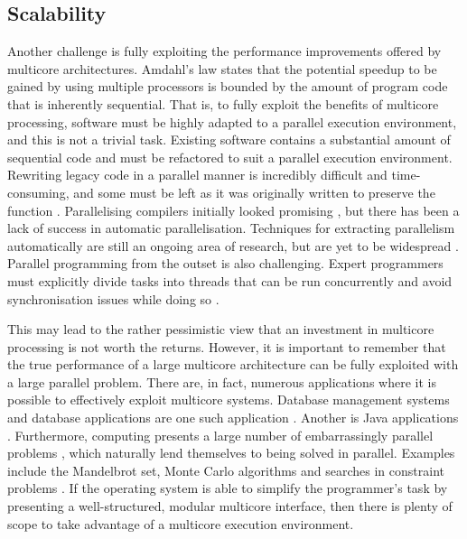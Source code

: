 \documentclass[bsc,frontabs,singlespacing,parskip,deptreport]{infthesis}
\begin{document}
\subsection{Scalability} \label{scalability-challenges}
Another challenge is fully exploiting the performance improvements offered by multicore architectures. Amdahl’s law \cite{DBLP:conf/afips/Amdahl67, DBLP:journals/computer/Amdahl13} states that the potential speedup to be gained by using multiple processors is bounded by the amount of program code that is inherently sequential. That is, to fully exploit the benefits of multicore processing, software must be highly adapted to a parallel execution environment, and this is not a trivial task. Existing software contains a substantial amount of sequential code and must be refactored to suit a parallel execution environment. Rewriting legacy code in a parallel manner is incredibly difficult and time-consuming, and some must be left as it was originally written to preserve the function \cite{geer}. Parallelising compilers initially looked promising \cite{lamport}, but there has been a lack of success in automatic parallelisation. Techniques for extracting parallelism automatically are still an ongoing area of research, but are yet to be widespread \cite{franke}. Parallel programming from the outset is also challenging. Expert programmers must explicitly divide tasks into threads that can be run concurrently and avoid synchronisation issues while doing so \cite{geer}. 

This may lead to the rather pessimistic view that an investment in multicore processing is not worth the returns. However, it is important to remember that the true performance of a large multicore architecture can be fully exploited with a large parallel problem. There are, in fact, numerous applications where it is possible to effectively exploit multicore systems. Database management systems and database applications are one such application \cite{DBLP:journals/queue/McDougall05}. Another is Java applications \cite{DBLP:journals/usenix-login/McDougallL06}. Furthermore, computing presents a large number of embarrassingly parallel problems \cite{DBLP:books/daglib/0020056}, which naturally lend themselves to being solved in parallel. Examples include the Mandelbrot set, Monte Carlo algorithms \cite{DBLP:conf/uai/NeiswangerWX14} and searches in constraint problems \cite{DBLP:journals/jair/MalapertRR16}. If the operating system is able to simplify the programmer's task by presenting a well-structured, modular multicore interface, then there is plenty of scope to take advantage of a multicore execution environment.
\end{document}
